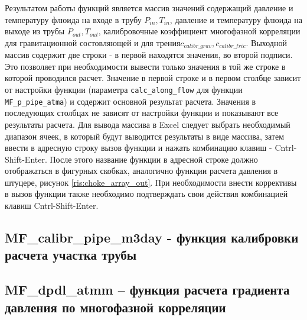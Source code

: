 Результатом работы функций является массив значений содержащий давление и температуру флюида на входе в трубу $P_{in}, T_{in}$, давление и температуру флюида на выходе из трубы $P_{out}, T_{out}$,  калибровочные коэффициент многофазной корреляции для гравитационной состовляющей и для трения$c_{calibr\_grav},c_{calibr\_fric}$.  Выходной массив содержит две строки - в первой находятся значения, во второй подписи. Это позволяет при необходимости вывести только значения в той же строке в которой проводился расчет. Значение в первой строке и в первом столбце зависит от настройки функции (параметра \texttt{calc_along_flow} для функции \texttt{MF_p_pipe_atma}) и содержит основной результат расчета. Значения в последующих столбцах не зависят от настройки функции и показывают все результаты расчета.
Для вывода массива в Excel следует выбрать необходимый диапазон ячеек, в который будут выводится результаты в виде массива, затем ввести в адресную строку вызов функции и нажать комбинацию клавиш - Cntrl-Shift-Enter. После этого название функции в адресной строке должно отображаться в фигурных скобках, аналогично функции расчета давления в штуцере, рисунок \ref{ris:choke_array_out}. При необходимости внести коррективы в вызов функции также необходимо подтверждать свои действия комбинацией клавиш Cntrl-Shift-Enter.


\subsection{MF\_calibr\_pipe\_m3day - функция калибровки расчета участка трубы}


%

\subsection{MF\_dpdl\_atmm – функция расчета градиента давления по многофазной корреляции}  


\newpage

